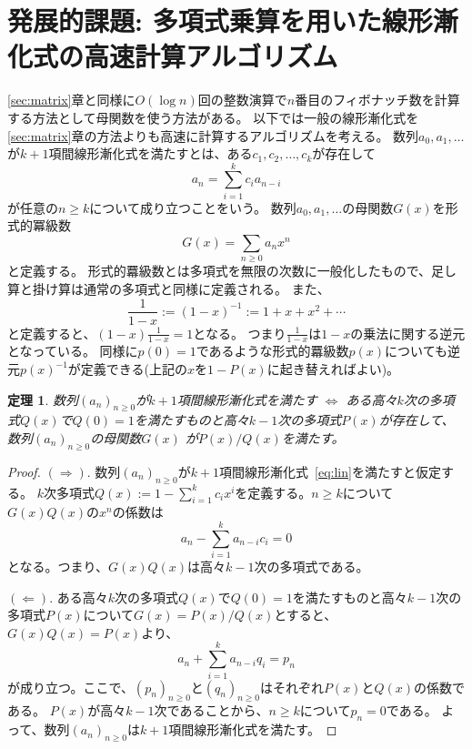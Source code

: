\documentclass[a4paper,twoside,onecolumn,openany,article]{memoir}
\theoremstyle{plain}
\newtheorem{theorem}{定理}
\theoremstyle{remark}
\begin{document}
\section{発展的課題: 多項式乗算を用いた線形漸化式の高速計算アルゴリズム}
\ref{sec:matrix}章と同様に$O(\log n)$回の整数演算で$n$番目のフィボナッチ数を計算する方法として母関数を使う方法がある。
以下では一般の線形漸化式を\ref{sec:matrix}章の方法よりも高速に計算するアルゴリズムを考える。
数列$a_0,a_1,\dotsc$が$k+1$項間線形漸化式を満たすとは、ある$c_1,c_2,\dotsc,c_k$が存在して
\begin{equation}
a_n = \sum_{i=1}^k c_i a_{n-i}
\label{eq:lin}
\end{equation}
が任意の$n\ge k$について成り立つことをいう。
数列$a_0,a_1,\dotsc$の母関数$G(x)$を形式的冪級数
\begin{equation*}
G(x)=\sum_{n\ge 0} a_n x^n
\end{equation*}
と定義する。
形式的羃級数とは多項式を無限の次数に一般化したもので、足し算と掛け算は通常の多項式と同様に定義される。
また、
\begin{equation*}
\frac1{1-x} := (1-x)^{-1} := 1+x+x^2+\dotsb
\end{equation*}
と定義すると、$(1-x) \frac1{1-x} = 1$となる。
つまり$\frac1{1-x}$は$1-x$の乗法に関する逆元となっている。
同様に$p(0)= 1$であるような形式的羃級数$p(x)$についても逆元$p(x)^{-1}$が定義できる(上記の$x$を$1-P(x)$に起き替えればよい)。
\begin{theorem}\label{thm:lin}
数列$(a_n)_{n\ge 0}$が$k+1$項間線形漸化式を満たす $\iff$ ある高々$k$次の多項式$Q(x)$で$Q(0)=1$を満たすものと高々$k-1$次の多項式$P(x)$が存在して、数列$(a_n)_{n\ge 0}$の母関数$G(x)$
が$P(x)/Q(x)$を満たす。
\end{theorem}
\begin{proof}
$(\Rightarrow).$
数列$(a_n)_{n\ge 0}$が$k+1$項間線形漸化式~\eqref{eq:lin}を満たすと仮定する。
$k$次多項式$Q(x):=1-\sum_{i=1}^k c_i x^i$を定義する。$n\ge k$について$G(x)Q(x)$の$x^n$の係数は
\begin{equation*}
a_n - \sum_{i=1}^k a_{n-i} c_i = 0
\end{equation*}
となる。つまり、$G(x)Q(x)$は高々$k-1$次の多項式である。

$(\Leftarrow).$
ある高々$k$次の多項式$Q(x)$で$Q(0)=1$を満たすものと高々$k-1$次の多項式$P(x)$について$G(x)=P(x)/Q(x)$とすると、$G(x)Q(x)=P(x)$より、
\begin{equation*}
a_n + \sum_{i=1}^k a_{n-i} q_i = p_n
\end{equation*}
が成り立つ。ここで、$(p_n)_{n\ge 0}$と$(q_n)_{n\ge 0}$はそれぞれ$P(x)$と$Q(x)$の係数である。
$P(x)$が高々$k-1$次であることから、$n\ge k$について$p_n=0$である。
よって、数列$(a_n)_{n\ge 0}$は$k+1$項間線形漸化式を満たす。
\end{proof}
\end{document}
